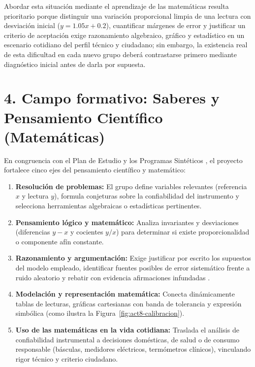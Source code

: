 \documentclass[spanish,letterpaper,oneside]{article}
\begin{document}
Abordar esta situación mediante el aprendizaje de las matemáticas resulta prioritario porque distinguir una variación proporcional limpia de una lectura con desviación inicial ($y = 1.05x + 0.2$), cuantificar márgenes de error y justificar un criterio de aceptación exige razonamiento algebraico, gráfico y estadístico en un escenario cotidiano del perfil técnico y ciudadano; sin embargo, la existencia real de esta dificultad en cada nuevo grupo deberá contrastarse primero mediante diagnóstico inicial antes de darla por supuesta.

\section{4. Campo formativo: Saberes y Pensamiento Científico (Matemáticas)}
En congruencia con el Plan de Estudio y los Programas Sintéticos \citep{sep2022plan,sep2024fase6}, el proyecto fortalece cinco ejes del pensamiento científico y matemático:
\begin{enumerate}
  \item \textbf{Resolución de problemas:} El grupo define variables relevantes (referencia $x$ y lectura $y$), formula conjeturas sobre la confiabilidad del instrumento y selecciona herramientas algebraicas o estadísticas pertinentes.
  \item \textbf{Pensamiento lógico y matemático:} Analiza invariantes y desviaciones (diferencias $y - x$ y cocientes $y/x$) para determinar si existe proporcionalidad o componente afín constante.
  \item \textbf{Razonamiento y argumentación:} Exige justificar por escrito los supuestos del modelo empleado, identificar fuentes posibles de error sistemático frente a ruido aleatorio y rebatir con evidencia afirmaciones infundadas \citep{eef2017mathematics}.
  \item \textbf{Modelación y representación matemática:} Conecta dinámicamente tablas de lecturas, gráficas cartesianas con banda de tolerancia y expresión simbólica (como ilustra la Figura~\ref{fig:act8-calibracion}).
  \item \textbf{Uso de las matemáticas en la vida cotidiana:} Traslada el análisis de confiabilidad instrumental a decisiones domésticas, de salud o de consumo responsable (básculas, medidores eléctricos, termómetros clínicos), vinculando rigor técnico y criterio ciudadano.
\end{enumerate}
\end{document}

